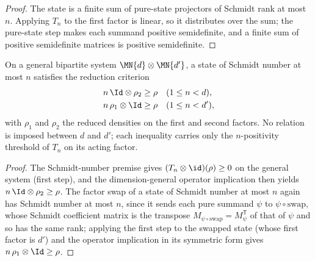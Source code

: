 \begin{proof}
    \leanok
    The state is a finite sum of pure-state projectors of Schmidt rank at most $n$.
    Applying $T_n$ to the first factor is linear, so it distributes over the sum; the
    pure-state step makes each summand positive semidefinite, and a finite sum of
    positive semidefinite matrices is positive semidefinite.
\end{proof}

\begin{theorem}
    \label{thm:reduction_criterion_of_schmidt_number}
    \leanok
    On a general bipartite system $\MN{d}\otimes\MN{d'}$, a state of Schmidt number at
    most $n$ satisfies the reduction criterion
    \begin{align}
        n\,\Id\otimes\rho_2 & \ge\rho
                            &         & (1\le n<d),
        \notag                                       \\
        n\,\rho_1\otimes\Id & \ge\rho
                            &         & (1\le n<d'),
        \notag
    \end{align}
    with $\rho_1$ and $\rho_2$ the reduced densities on the first and second factors.
    No relation is imposed between $d$ and $d'$; each inequality carries only the
    $n$-positivity threshold of $T_n$ on its acting factor.
\end{theorem}

\begin{proof}
    \leanok
    The Schmidt-number premise gives $(T_n\otimes\id)(\rho)\ge 0$ on the general system
    (first step), and the dimension-general operator implication then yields
    $n\,\Id\otimes\rho_2\ge\rho$. The factor swap of a state of Schmidt number at most
    $n$ again has Schmidt number at most $n$, since it sends each pure summand $\psi$ to
    $\psi\circ\mathrm{swap}$, whose Schmidt coefficient matrix is the transpose
    $M_{\psi\circ\mathrm{swap}}=M_\psi^{\mathsf T}$ of that of $\psi$ and so has the same
    rank; applying the first step to the swapped state (whose first factor is $d'$) and
    the operator implication in its symmetric form gives $n\,\rho_1\otimes\Id\ge\rho$.
\end{proof}


